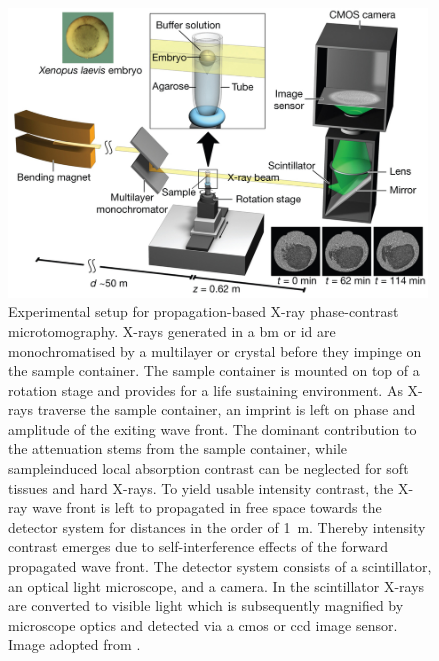 \documentclass[
twoside,
openright,
titlepage,
numbers=noenddot,
headinclude,
fleqn,
a4paper,
footinclude=true,
cleardoublepage=empty,
abstractoff,
BCOR=5mm,
paper=a4,
fontsize=11pt,
british,ngerman,american,
]{scrreprt}
\begin{document}
\begin{figure}
  \centering
  \includegraphics[width=0.99\textwidth]{figures/Nature/Fig-1.jpg}
  \caption[Experimental setup for propagation-based
  \acl{xpct}.]{Experimental setup for propagation-based X-ray
    phase-contrast microtomography.  X-rays generated in a \acf{bm} or
    \acf{id} are monochromatised by a multilayer or crystal before
    they impinge on the sample container.  The sample container is
    mounted on top of a rotation stage and provides for a life
    sustaining environment.  As X-rays traverse the sample container,
    an imprint is left on phase and amplitude of the exiting wave
    front.  The dominant contribution to the attenuation stems from
    the sample container, while sample\hyph induced local absorption
    contrast can be neglected for soft tissues and hard X-rays.  To
    yield usable intensity contrast, the X-ray wave front is left to
    propagated in free space towards the detector system for distances
    in the order of \SI{1}{m}.  Thereby intensity contrast emerges due
    to self-interference effects of the forward propagated wave front.
    The detector system consists of a scintillator, an optical light
    microscope, and a camera. In the scintillator X-rays are converted
    to visible light which is subsequently magnified by microscope
    optics and detected via a \acs{cmos} or \acs{ccd} image sensor.
    Image adopted from \cite{Moosmann2013nature}.}
  \label{fig:setup}
\end{figure}

\end{document}
